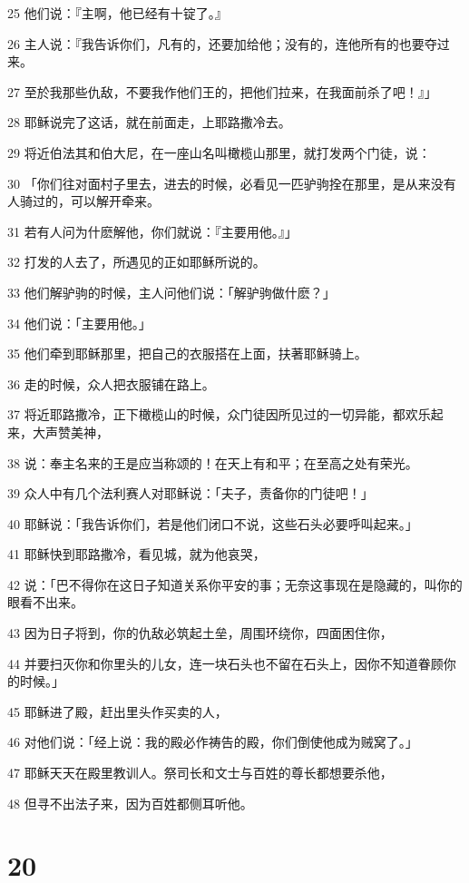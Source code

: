 \par 25 他们说：『主啊，他已经有十锭了。』
\par 26 主人说：『我告诉你们，凡有的，还要加给他；没有的，连他所有的也要夺过来。
\par 27 至於我那些仇敌，不要我作他们王的，把他们拉来，在我面前杀了吧！』」
\par 28 耶稣说完了这话，就在前面走，上耶路撒冷去。
\par 29 将近伯法其和伯大尼，在一座山名叫橄榄山那里，就打发两个门徒，说：
\par 30 「你们往对面村子里去，进去的时候，必看见一匹驴驹拴在那里，是从来没有人骑过的，可以解开牵来。
\par 31 若有人问为什麽解他，你们就说：『主要用他。』」
\par 32 打发的人去了，所遇见的正如耶稣所说的。
\par 33 他们解驴驹的时候，主人问他们说：「解驴驹做什麽？」
\par 34 他们说：「主要用他。」
\par 35 他们牵到耶稣那里，把自己的衣服搭在上面，扶著耶稣骑上。
\par 36 走的时候，众人把衣服铺在路上。
\par 37 将近耶路撒冷，正下橄榄山的时候，众门徒因所见过的一切异能，都欢乐起来，大声赞美神，
\par 38 说：奉主名来的王是应当称颂的！在天上有和平；在至高之处有荣光。
\par 39 众人中有几个法利赛人对耶稣说：「夫子，责备你的门徒吧！」
\par 40 耶稣说：「我告诉你们，若是他们闭口不说，这些石头必要呼叫起来。」
\par 41 耶稣快到耶路撒冷，看见城，就为他哀哭，
\par 42 说：「巴不得你在这日子知道关系你平安的事；无奈这事现在是隐藏的，叫你的眼看不出来。
\par 43 因为日子将到，你的仇敌必筑起土垒，周围环绕你，四面困住你，
\par 44 并要扫灭你和你里头的儿女，连一块石头也不留在石头上，因你不知道眷顾你的时候。」
\par 45 耶稣进了殿，赶出里头作买卖的人，
\par 46 对他们说：「经上说：我的殿必作祷告的殿，你们倒使他成为贼窝了。」
\par 47 耶稣天天在殿里教训人。祭司长和文士与百姓的尊长都想要杀他，
\par 48 但寻不出法子来，因为百姓都侧耳听他。

\chapter{20}

